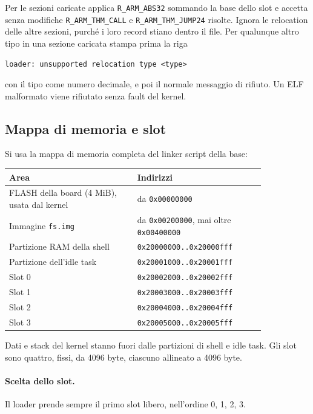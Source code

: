 Per le sezioni caricate applica \texttt{R\_ARM\_ABS32} sommando la base dello slot e accetta senza modifiche \texttt{R\_ARM\_THM\_CALL} e \texttt{R\_ARM\_THM\_JUMP24} risolte. Ignora le relocation delle altre sezioni, purché i loro record stiano dentro il file. Per qualunque altro tipo in una sezione caricata stampa prima la riga
\begin{lstlisting}
loader: unsupported relocation type <type>
\end{lstlisting}
con il tipo come numero decimale, e poi il normale messaggio di rifiuto. Un ELF malformato viene rifiutato senza fault del kernel.

\subsection{Mappa di memoria e slot}

Si usa la mappa di memoria completa del linker script della base:

\begin{center}
\small
\begin{tabular}{|p{0.42\linewidth}|p{0.42\linewidth}|}
\hline
\raggedright Area & \raggedright Indirizzi \tabularnewline
\hline\hline
\raggedright FLASH della board (4 MiB), usata dal kernel & \raggedright da \texttt{0x00000000} \tabularnewline
\hline
\raggedright Immagine \texttt{fs.img} & \raggedright da \texttt{0x00200000}, mai oltre \texttt{0x00400000} \tabularnewline
\hline
\raggedright Partizione RAM della shell & \raggedright \texttt{0x20000000..0x20000fff} \tabularnewline
\hline
\raggedright Partizione dell'idle task & \raggedright \texttt{0x20001000..0x20001fff} \tabularnewline
\hline
\raggedright Slot 0 & \raggedright \texttt{0x20002000..0x20002fff} \tabularnewline
\hline
\raggedright Slot 1 & \raggedright \texttt{0x20003000..0x20003fff} \tabularnewline
\hline
\raggedright Slot 2 & \raggedright \texttt{0x20004000..0x20004fff} \tabularnewline
\hline
\raggedright Slot 3 & \raggedright \texttt{0x20005000..0x20005fff} \tabularnewline
\hline
\end{tabular}
\end{center}

Dati e stack del kernel stanno fuori dalle partizioni di shell e idle task. Gli slot sono quattro, fissi, da 4096 byte, ciascuno allineato a 4096 byte.

\paragraph{Scelta dello slot.} Il loader prende sempre il primo slot libero, nell'ordine 0, 1, 2, 3.

